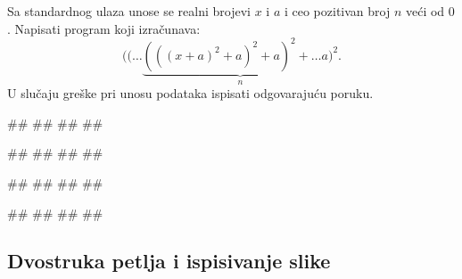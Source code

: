 \begin{Exercise}[label=p1.7_razno9] 
Sa standardnog ulaza unose se realni brojevi $x$ i $a$ i ceo
pozitivan broj $n$ veći od $0$.  Napisati program koji izračunava:
 $$((\ldots \underbrace{(((x+a)^2 + a)^2 + a)^2 + \ldots a)^2}_n.$$ U
slučaju greške pri unosu podataka ispisati odgovarajuću poruku. 

\begin{miditest}
\begin{upotreba}{1}
#\naslovInt#
##
##
##
\end{upotreba}
\end{miditest}
\begin{miditest}
\begin{upotreba}{2}
#\naslovInt#
##
##
##
\end{upotreba}
\end{miditest}

\begin{miditest}
\begin{upotreba}{3}
#\naslovInt#
##
##
##
\end{upotreba}
\end{miditest}
\begin{miditest}
\begin{upotreba}{4}
#\naslovInt#
##
##
##
\end{upotreba}
\end{miditest}
\end{Exercise}
\begin{Answer}[ref=p1.7_razno9]
\end{Answer}


\subsection{Dvostruka petlja i ispisivanje slike}


